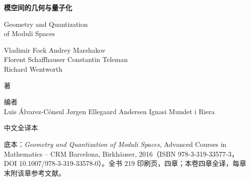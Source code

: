 \begin{titlepage}
\centering
\vspace*{2.6cm}
{\Huge\bfseries 模空间的几何与量子化\par}
\vspace{1.1cm}
{\Large Geometry and Quantization\\[0.2em] of Moduli Spaces\par}
\vspace{2.2cm}
{\large Vladimir Fock \quad Andrey Marshakov\\[0.35em]
Florent Schaffhauser \quad Constantin Teleman\\[0.35em]
Richard Wentworth\par}
\vspace{0.8cm}
{\large 著\par}
\vspace{1.2cm}
{\large 编者\\[0.3em]
Luis Álvarez-Cónsul \quad Jørgen Ellegaard Andersen \quad Ignasi Mundet i Riera\par}
\vspace{1.6cm}
{\large 中文全译本\par}
\vfill
{\small 底本：\emph{Geometry and Quantization of Moduli Spaces}, Advanced Courses in
Mathematics -- CRM Barcelona, Birkhäuser, 2016（ISBN 978-3-319-33577-3，\\
DOI 10.1007/978-3-319-33578-0）。全书 219 印刷页，四章；本卷四章全译，每章末附该章参考文献。\par}
\end{titlepage}
